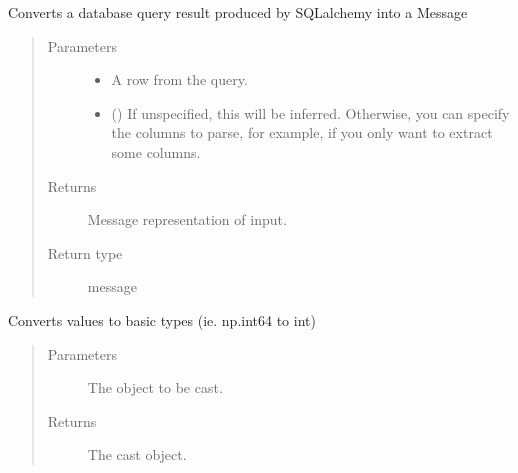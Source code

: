 \documentclass[letterpaper,10pt,english]{sphinxmanual}
\begin{document}

\begin{fulllineitems}
\label{\detokenize{Fireworks:Fireworks.extensions.database.to_message}}
Converts a database query result produced by SQLalchemy into a Message
\begin{quote}\begin{description}
\item[{Parameters}] \leavevmode\begin{itemize}
\item {} 
 \textendash{} A row from the query.

\item {} 
 () \textendash{} If unspecified, this will be inferred. Otherwise,
you can specify the columns
to parse, for example, if you only want to extract some columns.

\end{itemize}

\item[{Returns}] \leavevmode
Message representation of input.

\item[{Return type}] \leavevmode
message

\end{description}\end{quote}

\end{fulllineitems}


\begin{fulllineitems}
\label{\detokenize{Fireworks:Fireworks.extensions.database.cast}}
Converts values to basic types (ie. np.int64 to int)
\begin{quote}\begin{description}
\item[{Parameters}] \leavevmode
{} \textendash{} The object to be cast.

\item[{Returns}] \leavevmode
The cast object.

\end{description}\end{quote}

\end{fulllineitems}
\end{document}
